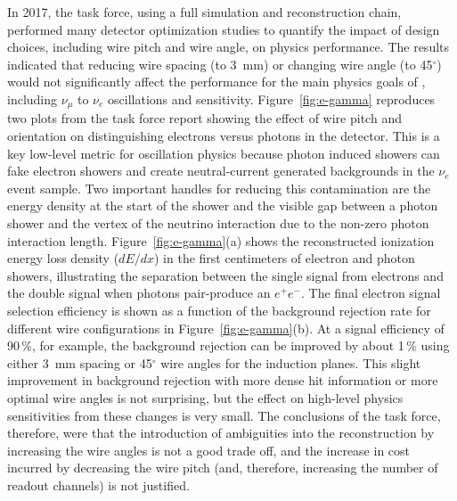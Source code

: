 \begin{itemize}
In 2017, the   task force, using a full  simulation and reconstruction chain, performed many detector optimization studies to quantify the impact of design choices, including wire pitch and wire angle, on  physics performance.  The results indicated that reducing wire spacing (to \SI{3}{mm}) or changing wire angle (to \num{45}$^\circ$) would not significantly affect the performance for the main physics goals of , including $\nu_\mu $ to $\nu_e$ oscillations and  sensitivity.  Figure~\ref{fig:e-gamma} reproduces two plots from the task force report showing the effect of wire pitch and orientation on distinguishing electrons versus photons in the detector.  This is a key low-level metric for oscillation physics because photon induced showers can fake electron showers and create neutral-current generated backgrounds in the $\nu_e$  event sample. Two important handles for reducing this contamination are the energy density at the start of the shower and the visible gap between a photon shower and the vertex of the neutrino interaction due to the non-zero photon interaction length.  Figure~\ref{fig:e-gamma}(a) shows the reconstructed ionization energy loss density ($dE/dx$) in the first centimeters of electron and photon showers, illustrating the separation between the single  signal from electrons and the double  signal when photons pair-produce an $e^+e^-$.  The final electron signal selection efficiency is shown as a function of the background rejection rate for different wire configurations in Figure~\ref{fig:e-gamma}(b). At a signal efficiency of \num{90}\,\%, for example, the background rejection can be improved by about \num{1}\,\% using either \SI{3}{mm} spacing or 45$^\circ$ wire angles for the induction planes.  This slight improvement in background rejection with more dense hit information or more optimal wire angles is not surprising, but the effect on high-level physics sensitivities from these changes is very small. The conclusions of the  task force, therefore, were that the introduction of ambiguities into the reconstruction by increasing the wire angles is not a good trade off, and the increase in cost incurred by decreasing the wire pitch (and, therefore, increasing the number of readout channels) is not justified.  



\end{itemize}
